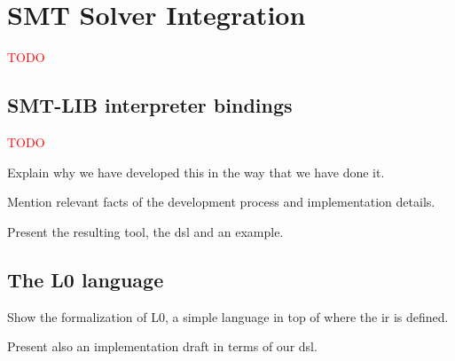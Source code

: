 \chapter{SMT Solver Integration}
\label{cap:smtSolverIntegration}

\textcolor{red}{TODO}

\section{SMT-LIB interpreter bindings}

\textcolor{red}{TODO}

Explain why we have developed this in the way that we have done it.

Mention relevant facts of the development process and implementation details.

Present the resulting tool, the \gls{dsl} and an example.

\section{The L0 language}

Show the formalization of L0, a simple language in top of where 
the \gls{ir} is defined.

Present also an implementation draft in terms of our \gls{dsl}.
